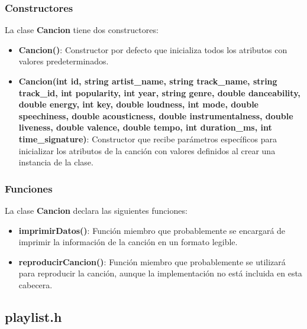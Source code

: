 \documentclass[12pt]{article}
\begin{document}
\begin{flushleft}
            \subsubsection{Constructores}
            
                \noindent\hspace*{4em}La clase \textbf{Cancion} tiene dos constructores:
                
                \begin{itemize}[left=4em]
                    \item \textbf{Cancion()}: Constructor por defecto que inicializa todos los atributos con valores predeterminados. 
                    \item \textbf{Cancion(int id, string artist\_name, string track\_name, string track\_id, int popularity, int year, string genre, double danceability, double energy, int key, double loudness, int mode, double speechiness, double acousticness, double instrumentalness, double liveness, double valence, double tempo, int duration\_ms, int time\_signature)}: Constructor que recibe parámetros específicos para inicializar los atributos de la canción con valores definidos al crear una instancia de la clase.
                \end{itemize}
            
            \subsubsection{Funciones}
            
                \noindent\hspace*{4em}La clase \textbf{Cancion} declara las siguientes funciones:
                
                \begin{itemize}[left=4em]
                    \item \textbf{imprimirDatos()}: Función miembro que probablemente se encargará de imprimir la información de la canción en un formato legible.
                    \item \textbf{reproducirCancion()}: Función miembro que probablemente se utilizará para reproducir la canción, aunque la implementación no está incluida en esta cabecera.
                \end{itemize}

            \subsection{playlist.h}


\end{flushleft}
\end{document}
